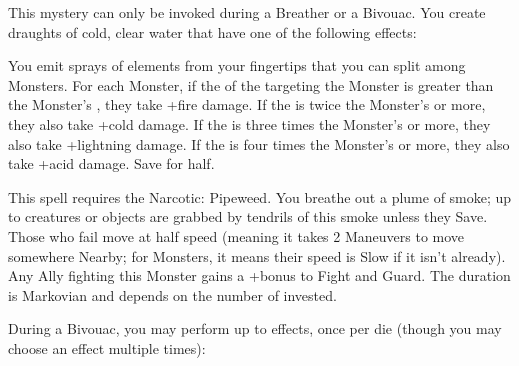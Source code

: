 This mystery can only be invoked during a Breather or a Bivouac.  You create \DICE draughts of cold, clear water that have one of the following effects:


\MYSTERY [
  Name = Elemental Spray,
  Link = arcana-mystery-elemental-spray,
  Paradigm = Elements,
  Save = Y (half),
  Duration = Instant,
  Target = Close or Nearby Target(s)
]

You emit \DICE sprays of elements from your fingertips that you can split among \DICE Monsters.  For each Monster, if the \SUMDICE of the \DICE targeting the Monster is greater than the Monster's \HD, they take \DICE+\DICE fire damage.  If the \SUMDICE is twice the Monster's \HD or more, they also take \DICE+\DICE cold damage.  If the \SUMDICE is three times the Monster's \HD or more, they also take \DICE+\DICE lightning damage.  If the \SUMDICE is four times the Monster's \HD or more, they also take \DICE+\DICE acid damage.  Save for half.

\MYSTERY [
  Name = Entangling Smoke ,
  Link = arcana-mystery-entangling-smoke,
  Paradigm = Elements,
  Save = Y (neg.),
  Duration = Markovian,
  Target = Close or Nearby Target(s)
]

This spell requires the Narcotic: Pipeweed.  You breathe out a plume of smoke; up to \DICE creatures or objects are grabbed by tendrils of this smoke unless they Save.  Those who fail move at half speed (meaning it takes 2 Maneuvers to move somewhere Nearby; for Monsters, it means their speed is Slow if it isn't already).  Any Ally fighting this Monster gains a +\DICE bonus to Fight and Guard. The duration is Markovian and depends on the number of \DICE invested.

\MYSTERY [
  Name = Hearthfire,
  Link = arcana-mystery-hearthfire,
  Paradigm = Elements,
  Save = n/a,
  Duration = Bivouac,
  Target = Close Target(s)
]

During a Bivouac, you may perform up to \DICE effects, once per die (though you may choose an effect multiple times):

